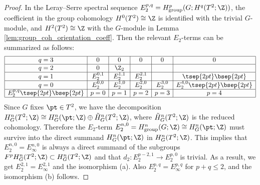 \begin{proof}
In the Leray--Serre spectral sequence
$E_2^{p, q} = H^p_{\mathrm{group}}(G; H^q(T^2; \Z))$, the coef\/f\/icient in the group cohomology $H^0(T^2) \cong \Z$ is identif\/ied with the trivial $G$-module, and $H^2(T^2) \cong \Z$ with the $G$-module in Lemma \ref{lem:group_coh_orientation_coeff}. Then the relevant $E_2$-terms can be summarized as follows:
$$
\begin{array}{|c|c|c|c|c|c|}
\hline
q = 3 & 0 & 0 & 0 & 0 & 0 \\
\hline
q = 2 & 0 & \Z_2 & & & \\
\hline
q = 1 & E_2^{0, 1} & E_2^{1, 1} & E_2^{2, 1} & & \tsep{2pt}\bsep{2pt}\\
\hline
q = 0 & E_2^{0, 0} & E_2^{1, 0} & E_2^{2, 0} & E_2^{3, 0} & E_2^{4, 0} \tsep{2pt}\bsep{2pt}\\
\hline
E_2^{p, q} \tsep{2pt}\bsep{2pt} & p = 0 & p = 1 & p = 2 & p = 3 & p = 4\\
\hline
\end{array}
$$
Since $G$ f\/ixes $\pt \in T^2$, we have the decomposition $H^n_G(T^2; \Z) \cong H^n_G(\pt; \Z) \oplus \tilde{H}^n_G(T^2; \Z)$, where $\tilde{H}^n_G(T^2; \Z)$ is the reduced cohomology. Therefore the $E_2$-term $E_2^{n, 0} = H^n_{\mathrm{group}}(G; \Z) \cong H^n_G(\pt; \Z)$ must survive into the direct summand $H^n_G(\pt; \Z)$ in $H^n_G(T^2; \Z)$. This implies that $E_2^{n, 0} = E_\infty^{n, 0}$ is always a direct summand of the subgroups $F^pH^n_G(T^2; \Z) \subset H^n_G(T^2; \Z)$ and that $d_2 \colon E_2^{p-2, 1} \to E_2^{p, 0}$ is trivial. As a result, we get $E_2^{2, 1} = E_\infty^{2, 1}$ and the isomorphism (a). Also $E_2^{p, q} = E_\infty^{p, q}$ for $p + q \le 2$, and the isomorphism (b) follows.
\end{proof}
